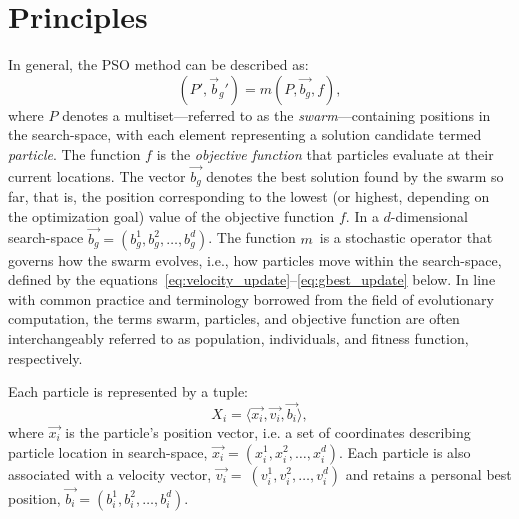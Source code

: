 {\section{Principles}








In general, the PSO method can be described as:
\begin{equation}\label{eq:pso}
(P', \vec{b}_g') = m(P, \vec{b_g}, f),
\end{equation}
where \(P\) denotes a multiset---referred to as the \textit{swarm}---containing positions in the \gls{search-space}, with each element representing a solution candidate termed \textit{particle}.
The function \(f\) is the \textit{objective function} that particles evaluate at their current locations.
The vector \(\vec{b_g}\) denotes the best solution found by the swarm so far, that is, the position corresponding to the lowest (or highest, depending on the optimization goal) value of the objective function \(f\).
In a \(d\)-dimensional \gls{search-space} \(\vec{b_g} = (b_{g}^{1}, b_{g}^{2}, \dots, b_{g}^{d}) \).
The function \(m\)~is a stochastic operator that governs how the swarm evolves, i.e., how particles move within the \gls{search-space}, defined by the equations~\eqref{eq:velocity_update}--\eqref{eq:gbest_update} below.
%
In line with common practice and terminology borrowed from the field of evolutionary computation, the terms swarm, particles, and objective function are often interchangeably referred to as population, individuals, and fitness function, respectively.

Each particle is represented by a tuple:
\begin{equation}\label{eq:particle}
X_i = \langle \vec{x_i}, \vec{v_{i}}, \vec{b_i} \rangle,
\end{equation}
where \(\vec{x_i}\) is the particle's position vector, i.e. a set of coordinates describing particle location in \gls{search-space},
\(\vec{x_i} = (x_{i}^{1}, x_{i}^{2}, \dots, x_{i}^{d})\). Each particle is also associated with a velocity vector, \(\vec{v_i} =\allowbreak\ (v_{i}^{1}, v_{i}^{2},\dots, v_{i}^{d})\) and retains a personal best position, 
\(\vec{b_i} = (b_{i}^{1}, b_{i}^{2}, \dots, b_{i}^{d}) \).



}
